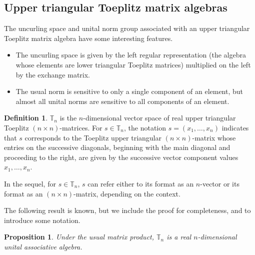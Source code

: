 \documentclass{amsart}
\numberwithin{equation}{section}
\newtheorem{proposition}[theorem]{Proposition}
\theoremstyle{definition}
\newtheorem{definition}[theorem]{Definition}
\numberwithin{theorem}{section}
\begin{document}
\subsection{Upper triangular Toeplitz matrix algebras}

The uncurling space and unital norm group associated with an upper triangular Toeplitz matrix algebra have some interesting features.
\begin{itemize}\item The uncurling space is given by the left regular representation (the algebra whose elements are lower triangular Toeplitz matrices) multiplied on the left by the exchange matrix. \item The usual norm is sensitive to only a single component of an element, but almost all unital norms are sensitive to all components of an element.\end{itemize}


 \begin{definition}\label{5/4/22.1} $\mathbb{T}_n$ is the $n$-dimensional vector space of real upper triangular Toeplitz $(n\times n)$-matrices. For $s\in \mathbb{T}_n$, the notation $s=(x_1,\dots,x_n)$ indicates that $s$ corresponds to the Toeplitz upper triangular $(n\times n)$-matrix whose entries on the successive diagonals, beginning with the main diagonal and proceeding to the right, are given by the successive vector component values $x_1,\dots,x_n$.   
\end{definition}

In the sequel, for $s\in \mathbb{T}_n$, $s$ can refer either to its format as an $n$-vector or its format as an $(n\times n)$-matrix, depending on the context.


The following result is known, but we include the proof for completeness, and to introduce some notation.  



 \begin{proposition}\label{5/10/22.1} Under the usual matrix product, $\mathbb{T}_n$ is a real $n$-dimensional unital associative algebra.\end{proposition} 
 
\end{document}

